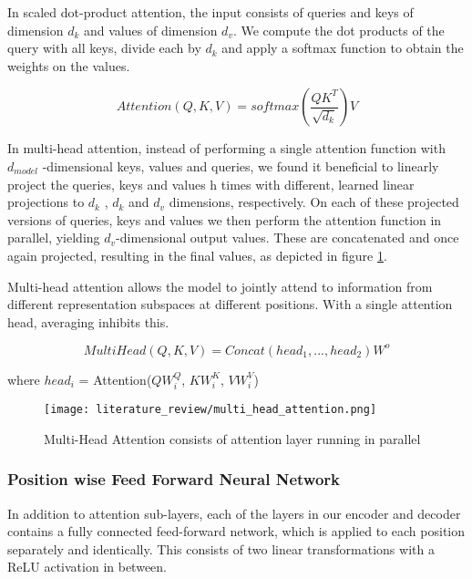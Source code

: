 In scaled dot-product attention, the input consists of queries and keys of dimension $d_k$ and values of dimension $d_v$. We compute the dot products of the query with all keys, divide each by $d_k$ and apply a softmax function to obtain the weights on the values.

\begin{equation}
    Attention(Q, K, V) = softmax(\frac{QK^{T}}{\sqrt{d_k}})V
\end{equation}


In multi-head attention, instead of performing a single attention function with $d_{model}$ -dimensional keys, values and queries, we found it beneficial to linearly project the queries, keys and values h times with different, learned linear projections to $d_k$ , $d_k$ and $d_v$ dimensions, respectively. On each of these projected versions of queries, keys and values we then perform the attention function in parallel, yielding $d_v$-dimensional
output values. These are concatenated and once again projected, resulting in the final values, as depicted in figure \ref{fig:Multi-Head Attention}.

Multi-head attention allows the model to jointly attend to information from different representation subspaces at different positions. With a single attention head, averaging inhibits this.

\begin{equation}
    MultiHead(Q, K, V) = Concat(head_1, ..., head_2)W^{o}
\end{equation}

\begin{center}
    where $head_i$ = Attention($QW_i^Q$, $KW_i^K$, $VW_i^V$)
\end{center}

\begin{figure}[H]
    \centering
    \texttt{[image: literature\_review/multi\_head\_attention.png]}
    \caption{Multi-Head Attention consists of attention layer running in parallel}
    \label{fig:Multi-Head Attention}
\end{figure}

\subsubsection{Position wise Feed Forward Neural Network}
In addition to attention sub-layers, each of the layers in our encoder and decoder contains a fully connected feed-forward network, which is applied to each position separately and identically. This consists of two linear transformations with a ReLU activation in between.

